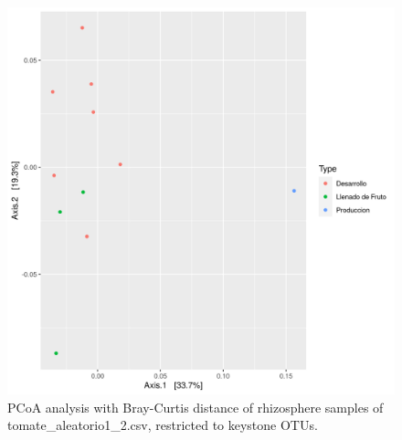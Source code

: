 \begin{figure}
  \centering
  \includegraphics[scale = 0.7]{pcoa_key_otus_tomate_aleatorio1_2.csv.png}
  \caption{PCoA analysis with Bray-Curtis distance of rhizosphere samples of tomate_aleatorio1_2.csv, restricted to keystone OTUs.}
  \label{fig:tomate_aleatorio1_2.csv_pcoa_key_otus}
\end{figure}
